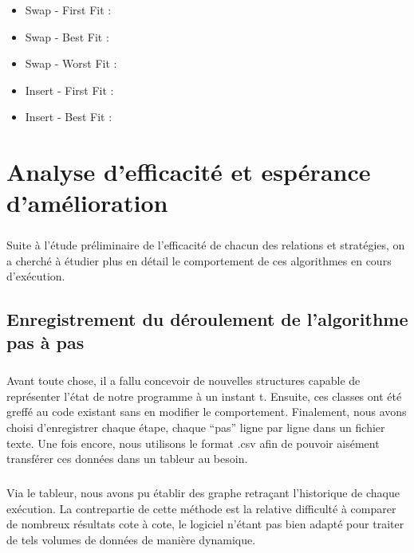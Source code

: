 \documentclass[a4paper,10pt]{report}
\begin{document}
\begin{itemize}
 \item Swap - First Fit : 
 \item Swap - Best Fit : 
 \item Swap - Worst Fit : 
 \item Insert - First Fit :
 \item Insert - Best Fit :
\end{itemize}


\chapter{Analyse d'efficacité et espérance d'amélioration}

\paragraph{}
  Suite à l'étude préliminaire de l'efficacité de chacun des relations et stratégies, on a cherché à étudier
plus en détail le comportement de ces algorithmes en cours d'exécution.

\section{Enregistrement du déroulement de l'algorithme pas à pas}

\paragraph{}
  Avant toute chose, il a fallu concevoir de nouvelles structures capable de représenter l'état de notre programme
à un instant t. Ensuite, ces classes ont été greffé au code existant sans en modifier le comportement. Finalement,
nous avons choisi d'enregistrer chaque étape, chaque ``pas'' ligne par ligne dans un fichier texte. Une fois encore,
nous utilisons le format .csv afin de pouvoir aisément transférer ces données dans un tableur au besoin.

\paragraph{}
  Via le tableur, nous avons pu établir des graphe retraçant l'historique de chaque exécution. La contrepartie de
cette méthode est la relative difficulté à comparer de nombreux résultats cote à cote, le logiciel n'étant pas
bien adapté pour traiter de tels volumes de données de manière dynamique.
\end{document}
